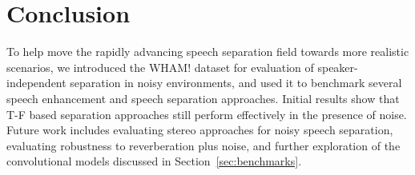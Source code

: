 \documentclass[a4paper]{article}
\begin{document}
\begin{table}[h]
    \footnotesize
    \caption{SI-SDR [dB] comparison of our implementations of other benchmark networks on the WHAM! separate-clean and separate-noisy tasks}\vspace{-0.5cm}
    \begin{center}
      \label{table:clean_v_noisy}
      \vspace{-.6cm}
    \end{center}
  \end{table}
  

\section{Conclusion}
To help move the rapidly advancing speech separation field towards more realistic scenarios, we introduced the WHAM! dataset for evaluation of speaker-independent separation in noisy environments, and used it to benchmark several speech enhancement and speech separation approaches. Initial results show that T-F based separation approaches still perform effectively in the presence of noise.
Future work includes evaluating stereo approaches for noisy speech separation, evaluating robustness to reverberation plus noise, and further exploration of the convolutional models discussed in Section~\ref{sec:benchmarks}.

\vfill\pagebreak
\balance




\end{document}

